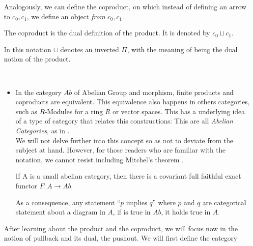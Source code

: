Analogously, we can define the coproduct, on which instead of defining an arrow to $c_0, c_1$, we define an object \emph{from} $c_0,c_1$. 
\begin{definition}
  The coproduct is the dual definition of the product. It is denoted by $c_0 \sqcup c_1$.
\end{definition}
In this notation $\sqcup$ denotes an inverted $\Pi$, with the meaning of being the dual notion of the product.
\begin{example}\ \label{example:mitchell}
  \begin{itemize}
  \item In the category $Ab$ of Abelian Group and morphism, finite products and coproducts are equivalent. This equivalence also happens in others categories, such as $R$-Modules for a ring $R$ or vector spaces. This has a underlying idea of a type of category that relates this constructions: This are all \emph{Abelian Categories}, as in \cite[Section 5.5]{rotman2008introduction}.\\

    We will not delve further into this concept so as not to deviate from the subject at hand. However, for those readers who are familiar with the notation, we cannot resist including Mitchel's theorem\cite[Chapter IV]{mitchell1965theory} .

    \begin{theorem} If A is a small abelian category, then there is a covariant full faithful exact functor $F : A \to Ab$.
    \end{theorem}

    As a consequence, any statement ``$p$ implies $q$'' where $p$ and $q$ are categorical statement about a diagram in $A$, if is true in  $Ab$, it holds true in $A$.
  \end{itemize}
\end{example}





After learning about the product and the coproduct, we will focus now in the notion of pullback and its dual, the pushout. We will first define the category

